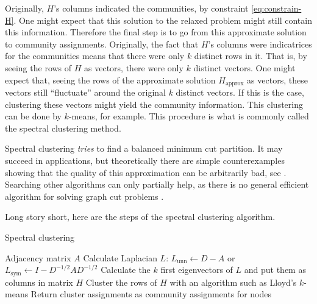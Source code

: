 \documentclass[../../main.tex]{subfiles} %
\begin{document}
Originally, \(H\)'s columns indicated the communities, by constraint 
\eqref{eq:constrain-H}. One might expect that this solution to the relaxed 
problem might still contain this information. Therefore the final step is to go 
from this approximate solution to community assignments. Originally, the fact 
that \(H\)'s columns were indicatrices for the communities means that there 
were only \(k\) distinct rows in it. That is, by seeing the rows of \(H\) as 
vectors, there were only \(k\) distinct vectors. One might expect that, seeing 
the rows of the approximate solution \(H_{\text{approx}}\) as vectors, these 
vectors still ``fluctuate'' around the original \(k\) distinct vectors. If this is the 
case, clustering these vectors might yield the community information. This 
clustering can be done by \(k\)-means, for example. This procedure is what is 
commonly called the spectral clustering method.




\begin{remark}
	Spectral clustering \textit{tries} to find a balanced minimum cut partition. It 
	may succeed in applications, but theoretically there are simple 
	counterexamples showing that the quality of this approximation can be 
	arbitrarily bad, see \cite{von_luxburg_tutorial_2007}. 
	Searching other algorithms can only partially help, as there is no general 
	efficient algorithm for solving graph cut problems 
	\cite{bui_finding_1992}.
\end{remark}

Long story short, here are the steps of the spectral clustering algorithm.
\begin{algorithm}
	\caption{Spectral clustering}
	\label{alg:spectral-clustering}
	\begin{algorithmic}
		\Require Adjacency matrix \(A\)
		\State Calculate Laplacian \(L\): \(L_{\text{unn}} \gets D - A\) or 
		\(L_{\text{sym}} \gets I - D^{-1/2} A D^{-1/2}\)
		\State Calculate the \(k\) first eigenvectors of \(L\) and put them as 
		columns in matrix \(H\)
		\State Cluster the rows of \(H\) with an algorithm such as Lloyd's
		\(k\)-means \cite{lloyd-k-means}
		\State Return cluster assignments as community assignments for 
		nodes
	\end{algorithmic}
\end{algorithm}
\end{document}
